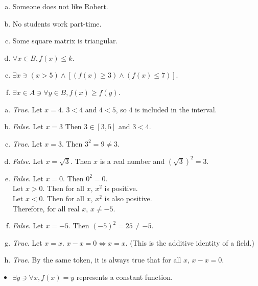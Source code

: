 \documentclass[12pt]{scrartcl} %
\begin{document}
\begin{enumerate}[(a)]
	\item Someone does not like Robert.
	\item No students work part-time.
	\item Some square matrix is triangular.
	\item $\forall x \in B, f(x) \leq k$.
	\item $\exists x \ni (x > 5) \land [(f(x) \geq 3) \land (f(x) \leq 7)]$.
	\item $\exists x \in A \ni \forall y \in B, f(x) \geq f(y)$.
\end{enumerate}

\begin{enumerate}[(a)]
	\item \emph{True}. Let $x = 4$. $3 < 4$ and $4 < 5$, so $4$ is included in the interval.
	\item \emph{False}. Let $x = 3$ Then $3 \in [3, 5]$ and $3 < 4$.
	\item \emph{True}. Let $x = 3$. Then $3^2 = 9 \neq 3$.
	\item \emph{False}. Let $x = \sqrt{3}$. Then $x$ is a real number and $(\sqrt{3})^2 = 3$.
	\item \emph{False}.
	Let $x = 0$. Then $0^2 = 0$. \\
	Let $x > 0$. Then for all $x$, $x^2$ is positive. \\
	Let $x < 0$. Then for all $x$, $x^2$ is also positive. \\
	Therefore, for all real $x$, $x \neq -5$.
	\item \emph{False}. Let $ x = -5$. Then $(-5)^2 = 25 \neq -5$.
	\item \emph{True}. Let $x = x$. $x - x = 0 \iff x = x$. (This is the additive identity of a field.)
	\item \emph{True}. By the same token, it is always true that for all $x$, $x - x = 0$.
\end{enumerate}

\begin{itemize}
	\item[] $\exists y \ni \forall x, f(x) = y$ represents a constant function.
\end{itemize}
\end{document}
